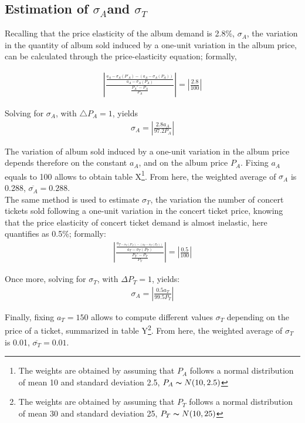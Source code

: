 \documentclass[a4paper,12pt]{article}
\numberwithin{equation}{section}
\begin{document}
\subsection{Estimation of $\sigma_{A}$and $\sigma_{T}$}

Recalling that the price elasticity of the album demand is 2.8\%,
$\sigma_{A}$, the variation in the quantity of album sold induced
by a one-unit variation in the album price, can be calculated through
the price-elasticity equation; formally,

\large
\begin{eqnarray*}
\left|\frac{\frac{a_{A} -\sigma_{A}(P'_{A})-(a_{A}-\sigma_{A}(P_{A}))}{a_{A}-\sigma_{A}(P_{A})}}{\frac{P_{A}'-P_{A}}{P_{A}}}\right|=\left|\frac{2.8}{100}\right|
\end{eqnarray*}
\normalsize

Solving for $\sigma_{A}$, with $\triangle P_{A}=1$, yields
\begin{eqnarray*}
\sigma_{A}=\left|\frac{2.8a_{A}}{97.2P_{A}}\right|
\end{eqnarray*}

The variation of album sold induced by a one-unit variation in the
album price depends therefore on the constant $a_{A}$, and on the
album price $P_{A}.$ Fixing $a_{A}$ equals to 100 allows to obtain
table X\footnote{
The weights are obtained by assuming that $P_{A}$ follows a normal distribution of mean 10 and standard deviation 2.5, $P_{A}\thicksim N(10,2.5)$
}. From here, the weighted average of $\sigma_{A}$ is 0.288, $\overline{\sigma_{A}}=0.288$.\\

The same method is used to estimate $\sigma_T$, the variation the number
of concert tickets sold following a one-unit variation in the concert
ticket price, knowing that the price elasticity of concert ticket
demand is almost inelastic, here quantifies as 0.5\%; formally:
\large
\begin{eqnarray*} 
\left|\frac{\frac{a_{T-\sigma_{T}(P'_{T})-(a_{T}-\sigma_{T}(P_{T}))}}{a_{T}-\sigma_{T}(P_{T})}}{\frac{P_{T}'-P_{T}}{P_{T}}}\right|=\left|\frac{0.5}{100}\right|
\end{eqnarray*}
\normalsize

Once more, solving for $\sigma_{T}$, with $\Delta P_{T}=1$, yields:
\begin{eqnarray*}
\sigma_{A}=\left|\frac{0.5a_{T}}{99.5P_{T}}\right|
\end{eqnarray*}

Finally, fixing $a_{T}=150$ allows to compute different values $\sigma_T$
depending on the price of a ticket, summarized in table Y\footnote{
The weights are obtained by assuming that $P_{T}$ follows a normal distribution of mean 30 and standard deviation 25, $P_{T}\thicksim N(10,25)$
}. From here, the weighted average of $\sigma_{T}$ is 0.01, $\overline{\sigma_{T}}=0.01$.\\
\end{document}
